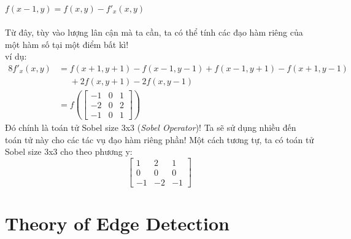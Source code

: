 \documentclass{article}
\begin{document}
$f(x-1,y) = f(x,y)-f'_{x}(x,y)$\\\\
Từ đây, tùy vào lượng lân cận mà ta cần, ta có thể tính các đạo hàm riêng của một hàm số tại một điểm bất kì!\\
ví dụ:
\begin{equation}
    \begin{aligned}
    8f'_{x}(x,y) &= f(x+1,y+1)-f(x-1,y-1)+f(x-1,y+1)-f(x+1,y-1)\\&\phantom{=}+2f(x,y+1)-2f(x,y-1)\\
    &=f\left(\begin{bmatrix}
        -1&0&1\\
        -2&0&2\\
        -1&0&1
    \end{bmatrix}\right)
    \end{aligned}
    \label{eq4}
\end{equation}
Đó chính là toán tử Sobel size 3x3 (\textit{Sobel Operator})! Ta sẽ sử dụng nhiều đến toán tử này cho các tác vụ đạo hàm riêng phần! Một cách tương tự, ta có toán tử Sobel size 3x3 cho theo phương y:
$$\begin{bmatrix}
    1&2&1\\
    0&0&0\\
    -1&-2&-1
\end{bmatrix}$$
\section{Theory of Edge Detection}
\end{document}
